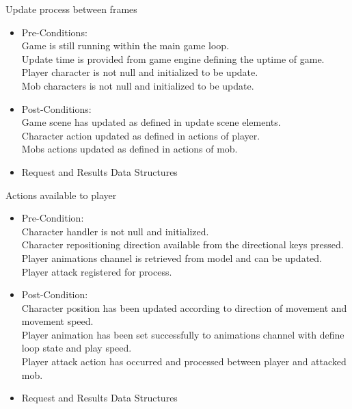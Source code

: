 \documentclass[letterpaper]{article}
\begin{document}
					\hspace{5mm}Update process between frames
					\begin{itemize}
						\item Pre-Conditions: \\
							Game is still running within the main game loop. \\
							Update time is provided from game engine defining the uptime of game. \\
							Player character is not null and initialized to be update. \\
							Mob characters is not null and initialized to be update.
						\item Post-Conditions: \\
							Game scene has updated as defined in update scene elements. \\
							Character action updated as defined in actions of player. \\
							Mobs actions updated as defined in actions of mob.
						\item Request and Results Data Structures \\
							
					\end{itemize}
					
					\vspace{0.1in}
					Actions available to player
					\begin{itemize}
						\item Pre-Condition: \\
							Character handler is not null and initialized. \\
							Character repositioning direction available from the directional keys pressed. \\
							Player animations channel is retrieved from model and can be updated. \\
							Player attack registered for process.
						\item Post-Condition: \\
							Character position has been updated according to direction of movement and movement speed. \\
							Player animation has been set successfully to animations channel with define loop state and play speed. \\
							Player attack action has occurred and processed between player and attacked mob.
						\item Request and Results Data Structures \\
							
					\end{itemize}
					
\end{document}
